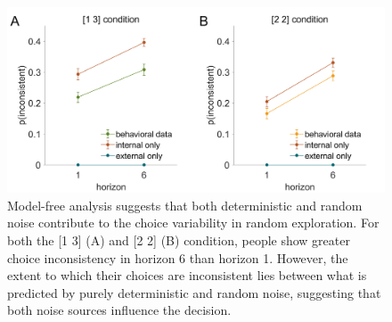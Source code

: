 \documentclass[12pt]{article}
\begin{document}
	\begin{figure}[h]
		\begin{center}
			\includegraphics[width=\textwidth]{figures/theory_da_info.png}
			\caption{Model-free analysis suggests that both deterministic and random noise contribute to the choice variability in random exploration. For both the [1 3] (A) and [2 2] (B) condition, people show greater choice inconsistency in horizon 6 than horizon 1. However, the extent to which their choices are inconsistent lies between what is predicted by purely deterministic and random noise, suggesting that both noise sources influence the decision.}
			\label{fig:mf2}
		\end{center}
	\end{figure}
	
\end{document}
